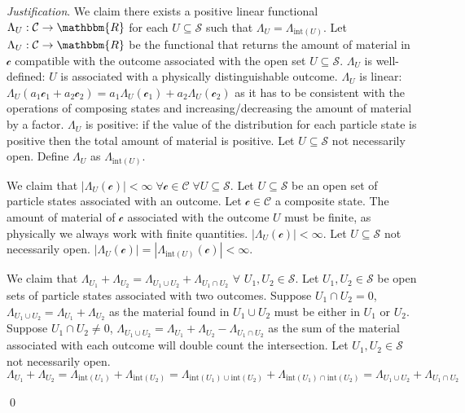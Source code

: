 \documentclass[aps,pra,10pt,twocolumn,floatfix,nofootinbib]{revtex4-1}
\numberwithin{equation}{section}
\theoremstyle{definition}
\newenvironment{justification}{\emph{Justification}.}{\qed}
\begin{document}
\begin{justification}
	We claim there exists a positive linear functional $\Lambda_U : \mathcal{C} \rightarrow \mathbbm{R}$ for each $U \subseteq \mathcal{S}$ such that $\Lambda_U = \Lambda_{\mathrm{int}(U)}$. Let $\Lambda_{U} : \mathcal{C} \rightarrow \mathbbm{R}$ be the functional that returns the amount of material in $\mathcal{c}$ compatible with the outcome associated with the open set $U \subseteq \mathcal{S}$. $\Lambda_U$ is well-defined: $U$ is associated with a physically distinguishable outcome. $\Lambda_U$ is linear: $\Lambda_U(a_1 \mathcal{c}_1 + a_2 \mathcal{c}_2) = a_1 \Lambda_U(\mathcal{c}_1) + a_2 \Lambda_U(\mathcal{c}_2)$ as it has to be consistent with the operations of composing states and increasing/decreasing the amount of material by a factor. $\Lambda_U$ is positive: if the value of the distribution for each particle state is positive then the total amount of material is positive. Let $U \subseteq \mathcal{S}$ not necessarily open. Define $\Lambda_U$ as $\Lambda_{\mathrm{int}(U)}$.
	
	We claim that $|\Lambda_{U}(\mathcal{c})| < \infty \; \forall \mathcal{c} \in \mathcal{C} \; \forall U \subseteq \mathcal{S}$. Let $U \subseteq \mathcal{S}$ be an open set of particle states associated with an outcome. Let $\mathcal{c} \in \mathcal{C}$ a composite state. The amount of material of $\mathcal{c}$ associated with the outcome $U$ must be finite, as physically we always work with finite quantities. $|\Lambda_{U}(\mathcal{c})| < \infty$. Let $U \subseteq \mathcal{S}$ not necessarily open. $|\Lambda_{U}(\mathcal{c})| = |\Lambda_{\mathrm{int}(U)}(\mathcal{c})| < \infty$.
	
	We claim that $\Lambda_{U_1} + \Lambda_{U_2} = \Lambda_{U_1 \cup U_2} + \Lambda_{U_1 \cap U_2}$ $\forall $ $U_1, U_2 \in \mathcal{S}$. Let $U_1, U_2 \in \mathcal{S}$ be open sets of particle states associated with two outcomes. Suppose $U_1 \cap U_2 = 0$, $\Lambda_{U_1 \cup U_2} = \Lambda_{U_1} + \Lambda_{U_2}$ as the material found in $U_1 \cup U_2$ must be either in $U_1$ or $U_2$. Suppose $U_1 \cap U_2 \neq 0$, $\Lambda_{U_1 \cup U_2} = \Lambda_{U_1} + \Lambda_{U_2} - \Lambda_{U_1 \cap U_2}$ as the sum of the material associated with each outcome will double count the intersection. Let $U_1, U_2 \in \mathcal{S}$ not necessarily open. $\Lambda_{U_1} + \Lambda_{U_2} = \Lambda_{\mathrm{int}(U_1)} + \Lambda_{\mathrm{int}(U_2)} = \Lambda_{\mathrm{int}(U_1) \cup \mathrm{int}(U_2)} + \Lambda_{\mathrm{int}(U_1) \cap \mathrm{int}(U_2)} = \Lambda_{U_1 \cup U_2} + \Lambda_{U_1 \cap U_2}$
	

\end{justification}
\end{document}
